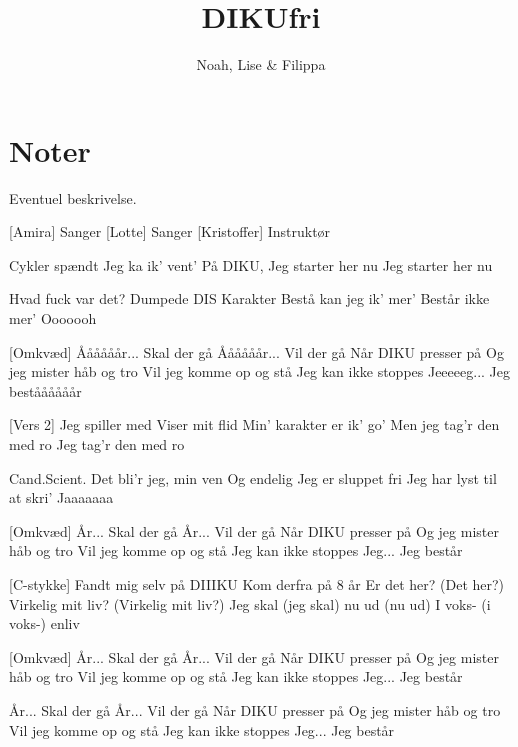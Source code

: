 \documentclass{article}
\title{DIKUfri}                   %
\author{Noah, Lise \& Filippa}  %
\begin{document}
                
\maketitle
\section*{Noter}                %
Eventuel beskrivelse.

\begin{roles}
[Amira] Sanger
[Lotte] Sanger
[Kristoffer] Instruktør
\end{roles}

\begin{props}
\end{props}

\newpage%
\begin{song}
[Vers 1]
%
Cykler spændt
Jeg ka ik’ vent’
På DIKU, 
Jeg starter her nu
Jeg starter her nu

%
Hvad fuck var det?
Dumpede DIS
Karakter
Bestå kan jeg ik’ mer’
Består ikke mer’
Ooooooh


[Omkvæd]
%
Åååååår... Skal der gå
Åååååår... Vil der gå
Når DIKU presser på
Og jeg mister håb og tro
Vil jeg komme op og stå
Jeg kan ikke stoppes
Jeeeeeg... Jeg beståååååår


[Vers 2]
%
Jeg spiller med
Viser mit flid
Min’ karakter er ik’ go’
Men jeg tag’r den med ro
Jeg tag’r den med ro

%
Cand.Scient.
Det bli’r jeg, min ven
Og endelig
Jeg er sluppet fri
Jeg har lyst til at skri’
Jaaaaaaa


[Omkvæd]
%
År... Skal der gå
År... Vil der gå
Når DIKU presser på
Og jeg mister håb og tro
Vil jeg komme op og stå
Jeg kan ikke stoppes
Jeg... Jeg består


[C-stykke]
%
Fandt mig selv
på DIIIKU
Kom derfra
på 8 år
Er det her? (Det her?)
Virkelig mit liv? (Virkelig mit liv?)
Jeg skal (jeg skal) nu ud (nu ud) 
I voks- (i voks-) enliv


[Omkvæd]
%
År... Skal der gå
År... Vil der gå
Når DIKU presser på
Og jeg mister håb og tro
Vil jeg komme op og stå
Jeg kan ikke stoppes
Jeg... Jeg består

År... Skal der gå
År... Vil der gå
Når DIKU presser på
Og jeg mister håb og tro
Vil jeg komme op og stå
Jeg kan ikke stoppes
Jeg... Jeg består

\end{song}
\end{document}
